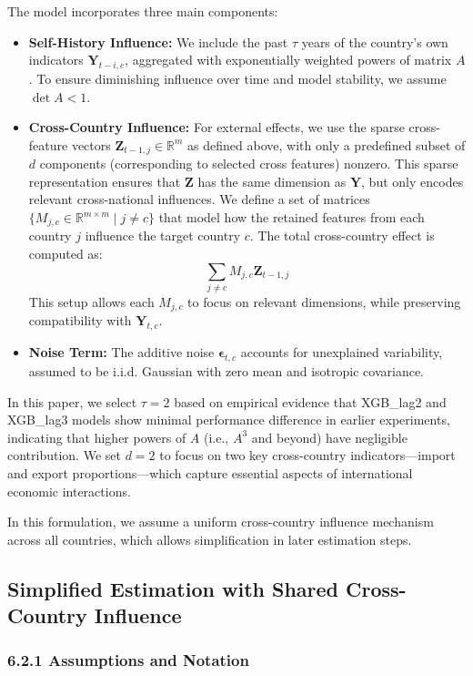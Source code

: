 \documentclass[12pt]{article}
\begin{document}
The model incorporates three main components:
\begin{itemize}
  \item \textbf{Self-History Influence:} We include the past $\tau$ years of the country's own indicators $\mathbf{Y}_{t-i,c}$, aggregated with exponentially weighted powers of matrix $A$. To ensure diminishing influence over time and model stability, we assume $\det A < 1$.
  \item \textbf{Cross-Country Influence:} For external effects, we use the sparse cross-feature vectors $\mathbf{Z}_{t-1,j} \in \mathbb{R}^m$ as defined above, with only a predefined subset of $d$ components (corresponding to selected cross features) nonzero. This sparse representation ensures that $\mathbf{Z}$ has the same dimension as $\mathbf{Y}$, but only encodes relevant cross-national influences. We define a set of matrices $\{M_{j,c} \in \mathbb{R}^{m \times m} \mid j \neq c\}$ that model how the retained features from each country $j$ influence the target country $c$. The total cross-country effect is computed as:
  \[
  \sum_{j \neq c} M_{j,c} \mathbf{Z}_{t-1,j}
  \]
  This setup allows each $M_{j,c}$ to focus on relevant dimensions, while preserving compatibility with $\mathbf{Y}_{t,c}$.
  \item \textbf{Noise Term:} The additive noise $\boldsymbol{\epsilon}_{t,c}$ accounts for unexplained variability, assumed to be i.i.d. Gaussian with zero mean and isotropic covariance.
\end{itemize}

In this paper, we select $\tau = 2$ based on empirical evidence that XGB\_lag2 and XGB\_lag3 models show minimal performance difference in earlier experiments, indicating that higher powers of $A$ (i.e., $A^3$ and beyond) have negligible contribution. We set $d = 2$ to focus on two key cross-country indicators—import and export proportions—which capture essential aspects of international economic interactions.


In this formulation, we assume a uniform cross-country influence mechanism across all countries, which allows simplification in later estimation steps.


\subsection{Simplified Estimation with Shared Cross-Country Influence}

\subsubsection*{6.2.1 Assumptions and Notation}
\end{document}

